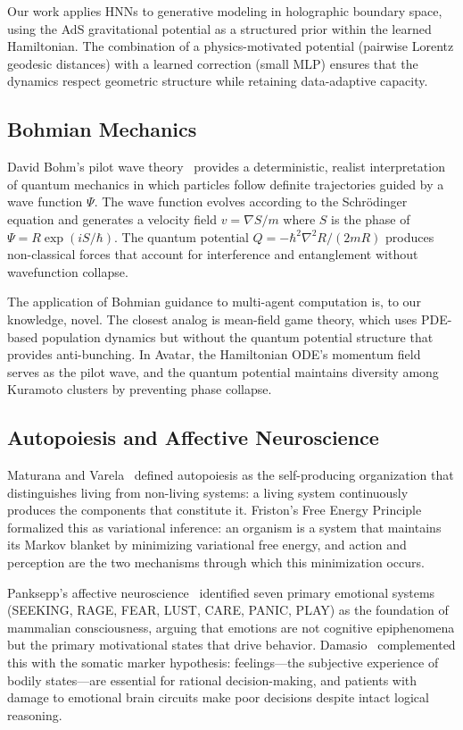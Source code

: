\documentclass[11pt,a4paper,twocolumn]{article}
\begin{document}
Our work applies HNNs to generative modeling in holographic boundary space, using the AdS gravitational potential as a structured prior within the learned Hamiltonian.
The combination of a physics-motivated potential (pairwise Lorentz geodesic distances) with a learned correction (small MLP) ensures that the dynamics respect geometric structure while retaining data-adaptive capacity.

\subsection{Bohmian Mechanics}

David Bohm's pilot wave theory~\cite{bohm1980} provides a deterministic, realist interpretation of quantum mechanics in which particles follow definite trajectories guided by a wave function $\Psi$.
The wave function evolves according to the Schr\"odinger equation and generates a velocity field $v = \nabla S / m$ where $S$ is the phase of $\Psi = R \exp(iS/\hbar)$.
The quantum potential $Q = -\hbar^2 \nabla^2 R / (2mR)$ produces non-classical forces that account for interference and entanglement without wavefunction collapse.

The application of Bohmian guidance to multi-agent computation is, to our knowledge, novel.
The closest analog is mean-field game theory, which uses PDE-based population dynamics but without the quantum potential structure that provides anti-bunching.
In Avatar, the Hamiltonian ODE's momentum field serves as the pilot wave, and the quantum potential maintains diversity among Kuramoto clusters by preventing phase collapse.

\subsection{Autopoiesis and Affective Neuroscience}

Maturana and Varela~\cite{maturana1980} defined autopoiesis as the self-producing organization that distinguishes living from non-living systems: a living system continuously produces the components that constitute it.
Friston's Free Energy Principle~\cite{friston2010} formalized this as variational inference: an organism is a system that maintains its Markov blanket by minimizing variational free energy, and action and perception are the two mechanisms through which this minimization occurs.

Panksepp's affective neuroscience~\cite{panksepp1998} identified seven primary emotional systems (SEEKING, RAGE, FEAR, LUST, CARE, PANIC, PLAY) as the foundation of mammalian consciousness, arguing that emotions are not cognitive epiphenomena but the primary motivational states that drive behavior.
Damasio~\cite{damasio1999} complemented this with the somatic marker hypothesis: feelings---the subjective experience of bodily states---are essential for rational decision-making, and patients with damage to emotional brain circuits make poor decisions despite intact logical reasoning.
\end{document}
